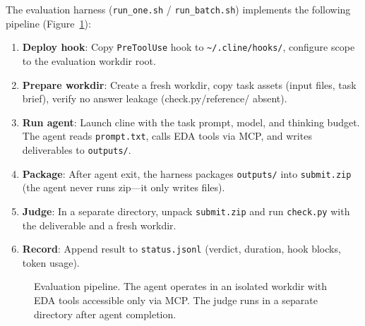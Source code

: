 The evaluation harness (\texttt{run\_one.sh} / \texttt{run\_batch.sh}) implements the following pipeline (Figure~\ref{fig:pipeline}):

\begin{enumerate}
    \item \textbf{Deploy hook}: Copy \texttt{PreToolUse} hook to \texttt{\textasciitilde/.cline/hooks/}, configure scope to the evaluation workdir root.
    \item \textbf{Prepare workdir}: Create a fresh workdir, copy task assets (input files, task brief), verify no answer leakage (check.py/reference/ absent).
    \item \textbf{Run agent}: Launch cline with the task prompt, model, and thinking budget. The agent reads \texttt{prompt.txt}, calls EDA tools via MCP, and writes deliverables to \texttt{outputs/}.
    \item \textbf{Package}: After agent exit, the harness packages \texttt{outputs/} into \texttt{submit.zip} (the agent never runs zip---it only writes files).
    \item \textbf{Judge}: In a separate directory, unpack \texttt{submit.zip} and run \texttt{check.py} with the deliverable and a fresh workdir.
    \item \textbf{Record}: Append result to \texttt{status.jsonl} (verdict, duration, hook blocks, token usage).
\end{enumerate}

\begin{figure}[ht]
\centering
\caption{Evaluation pipeline. The agent operates in an isolated workdir with EDA tools accessible only via MCP. The judge runs in a separate directory after agent completion.}
\label{fig:pipeline}
\end{figure}


